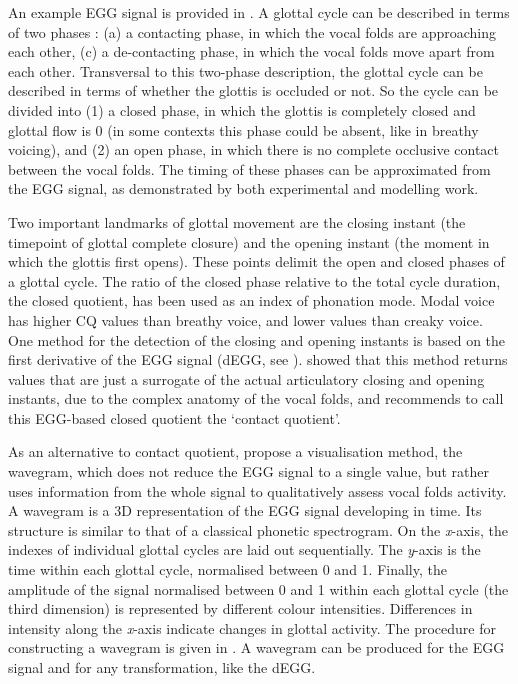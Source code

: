 \documentclass[12pt,a4paper,]{article}
\begin{document}
An example EGG signal is provided in . A glottal cycle can
be described in terms of two phases \citep{childers1985, hampala2016}:
(a) a contacting phase, in which the vocal folds are approaching each
other, (c) a de-contacting phase, in which the vocal folds move apart
from each other. Transversal to this two-phase description, the glottal
cycle can be described in terms of whether the glottis is occluded or
not. So the cycle can be divided into (1) a closed phase, in which the
glottis is completely closed and glottal flow is 0 (in some contexts
this phase could be absent, like in breathy voicing), and (2) an open
phase, in which there is no complete occlusive contact between the vocal
folds. The timing of these phases can be approximated from the EGG
signal, as demonstrated by both experimental and modelling work.

Two important landmarks of glottal movement are the closing instant (the
timepoint of glottal complete closure) and the opening instant (the
moment in which the glottis first opens). These points delimit the open
and closed phases of a glottal cycle. The ratio of the closed phase
relative to the total cycle duration, the closed quotient, has been used
as an index of phonation mode. Modal voice has higher CQ values than
breathy voice, and lower values than creaky voice. One method for the
detection of the closing and opening instants is based on the first
derivative of the EGG signal (dEGG, see ).
\citet{herbst2017} showed that this method returns values that are just
a surrogate of the actual articulatory closing and opening instants, due
to the complex anatomy of the vocal folds, and recommends to call this
EGG-based closed quotient the `contact quotient'.

As an alternative to contact quotient, \citet{herbst2010} propose a
visualisation method, the wavegram, which does not reduce the EGG signal
to a single value, but rather uses information from the whole signal to
qualitatively assess vocal folds activity. A wavegram is a 3D
representation of the EGG signal developing in time. Its structure is
similar to that of a classical phonetic spectrogram. On the
\emph{x}-axis, the indexes of individual glottal cycles are laid out
sequentially. The \emph{y}-axis is the time within each glottal cycle,
normalised between 0 and 1. Finally, the amplitude of the signal
normalised between 0 and 1 within each glottal cycle (the third
dimension) is represented by different colour intensities. Differences
in intensity along the \emph{x}-axis indicate changes in glottal
activity. The procedure for constructing a wavegram is given in
. A wavegram can be produced for the EGG signal and for
any transformation, like the dEGG.
\end{document}
